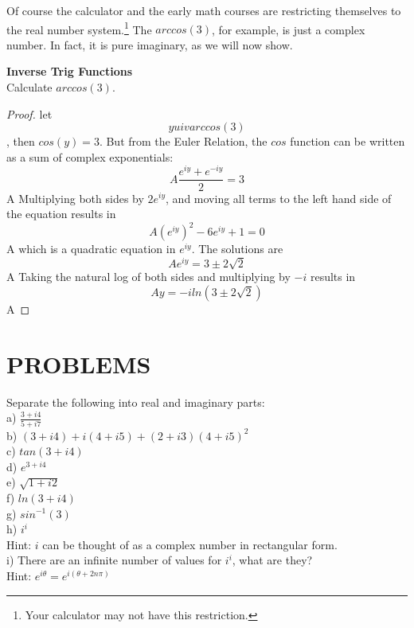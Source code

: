 Of course the calculator and the early math courses are
restricting themselves to the real number system.\footnote{Your 
calculator may not have this restriction.}
The $arccos(3)$, for example, is just a complex number.
In fact, it is pure imaginary, as we will now show.


\begin{example}
\textbf{Inverse Trig Functions}\\
Calculate $arccos(3)$.
\end{example}

\begin{proof}
let 
\begin{equation}
y uiv arccos(3)
\end{equation}, then $cos(y) = 3$.
But from the Euler Relation, the $cos$ function
can be written as a sum of complex exponentials:
\begin{equation}A
\frac {e^{iy} + e^{-iy}}{2} = 3
\end{equation}
A
Multiplying both sides by $2e^{iy}$, and moving
all terms to the left hand side of the equation
results in
\begin{equation}A
{\left ( e^{iy} \right ) }^2 - 6e^{iy} +1=0
\end{equation}A
which is a quadratic equation in $e^{iy}$.  The
solutions are
\begin{equation}A
e^{iy}=3 \pm 2 \sqrt{2}
\end{equation}A
Taking the natural log of both sides and multiplying by
$-i$ results in
\begin{equation}A
y = -i ln(3 \pm 2 \sqrt{2})
\end{equation}A
\end{proof}


\section{PROBLEMS}

\begin{problems}
Separate the following into real and imaginary parts:\\
a)      $\frac{3+i4}{5+i7}$\\
b)      $(3+i4) +i(4+i5) + (2+i3)(4+i5)^2$\\
c)      $tan(3+i4)$\\
d)      $e^{3+i4}$\\
e)      $\sqrt{1+i2}$\\
f)      $ln(3+i4)$\\
g)      $sin^{-1} (3)$\\
h)      $i^i$\\
        Hint: $i$ can be thought of as a complex number in rectangular form.\\
i)      There are an infinite number of values for $i^i$, what are they?\\
        Hint: $e^{i \theta} = e^{i( \theta + 2n \pi )}$\\
\end{problems}

